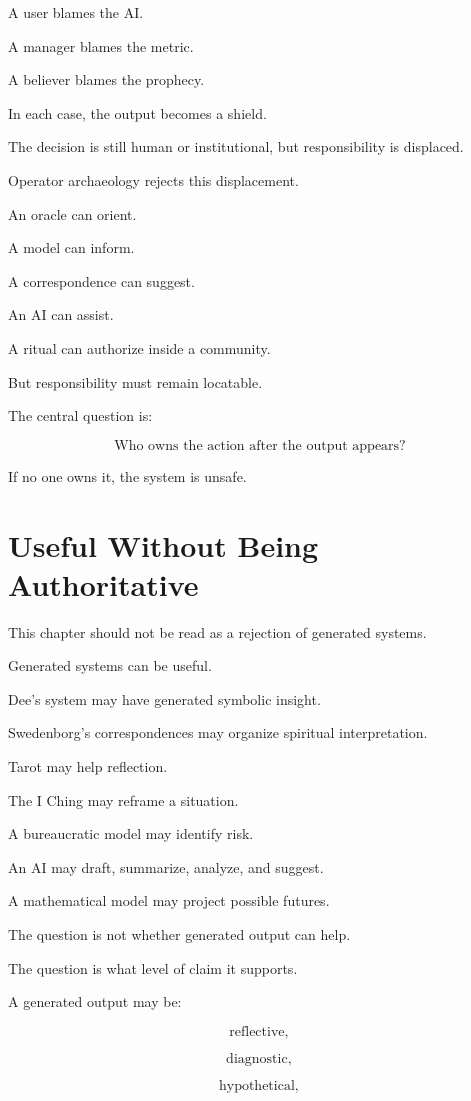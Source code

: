 \documentclass[11pt]{book}
\begin{document}
A user blames the AI.

A manager blames the metric.

A believer blames the prophecy.

In each case, the output becomes a shield.

The decision is still human or institutional, but responsibility is displaced.

Operator archaeology rejects this displacement.

An oracle can orient.

A model can inform.

A correspondence can suggest.

An AI can assist.

A ritual can authorize inside a community.

But responsibility must remain locatable.

The central question is:

\[
\text{Who owns the action after the output appears?}
\]

If no one owns it, the system is unsafe.

\section{Useful Without Being Authoritative}

This chapter should not be read as a rejection of generated systems.

Generated systems can be useful.

Dee's system may have generated symbolic insight.

Swedenborg's correspondences may organize spiritual interpretation.

Tarot may help reflection.

The I Ching may reframe a situation.

A bureaucratic model may identify risk.

An AI may draft, summarize, analyze, and suggest.

A mathematical model may project possible futures.

The question is not whether generated output can help.

The question is what level of claim it supports.

A generated output may be:

\[
\text{reflective},
\]

\[
\text{diagnostic},
\]

\[
\text{hypothetical},
\]
\end{document}
